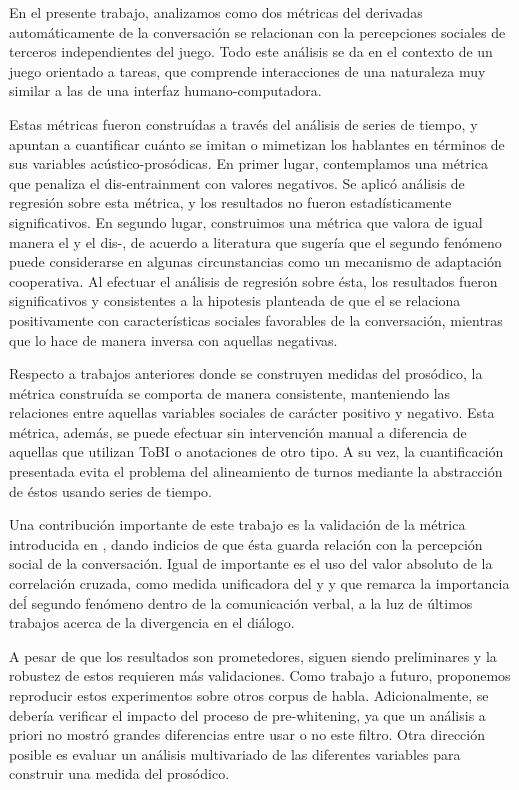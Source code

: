 En el presente trabajo, analizamos como dos métricas del \entrainment derivadas automáticamente de la conversación se relacionan con la percepciones sociales de terceros independientes del juego. Todo este análisis se da en el contexto de un juego orientado a tareas, que comprende interacciones de una naturaleza muy similar a las de una interfaz humano-computadora.

Estas métricas fueron construídas a través del análisis de series de tiempo, y apuntan a cuantificar cuánto se imitan o mimetizan los hablantes en términos de sus variables acústico-prosódicas. En primer lugar, contemplamos una métrica que penaliza el dis-entrainment con valores negativos. Se aplicó análisis de regresión sobre esta métrica, y los resultados no fueron estadísticamente significativos. En segundo lugar, construimos una métrica que valora de igual manera el \entrainment y el dis-\entrainment, de acuerdo a literatura que sugería que el segundo fenómeno puede considerarse en algunas circunstancias como un mecanismo de adaptación cooperativa. Al efectuar el análisis de regresión sobre ésta, los resultados fueron significativos y consistentes a la hipotesis planteada de que el \entrainment se relaciona positivamente con características sociales favorables de la conversación, mientras que lo hace de manera inversa con aquellas negativas.

Respecto a trabajos anteriores donde se construyen medidas del \entrainment prosódico, la métrica construída se comporta de manera consistente, manteniendo las relaciones entre aquellas variables sociales de carácter positivo y negativo. Esta métrica, además, se puede efectuar sin intervención manual a diferencia de aquellas que utilizan ToBI o anotaciones de otro tipo. A su vez, la cuantificación presentada evita el problema del alineamiento de turnos mediante la abstracción de éstos usando series de tiempo.

Una contribución importante de este trabajo es la validación de la métrica introducida en \cite{KOU2008.2}, dando indicios de que ésta guarda relación con la percepción social de la conversación. Igual de importante es el uso del valor absoluto de la correlación cruzada, como medida unificadora del \entrainment y \disentrainment y que remarca la importancia deĺ segundo fenómeno dentro de la comunicación verbal, a la luz de últimos trabajos acerca de la divergencia en el diálogo.

A pesar de que los resultados son prometedores, siguen siendo preliminares y la robustez de estos requieren más validaciones. Como trabajo a futuro, proponemos reproducir estos experimentos sobre otros corpus de habla. Adicionalmente, se debería verificar el impacto del proceso de pre-whitening, ya que un análisis a priori no mostró grandes diferencias entre usar o no este filtro. Otra dirección posible es evaluar un análisis multivariado de las diferentes variables \ap para construir una medida del \entrainment prosódico.
